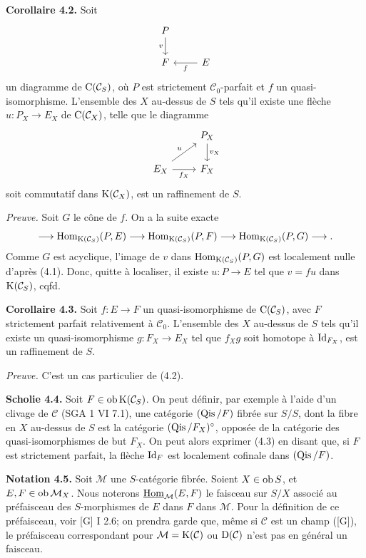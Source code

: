 \documentclass[11pt]{article}
\begin{document}
\textbf{Corollaire 4.2.} Soit
\[
\begin{tikzcd}
P \arrow[d,"v"'] \\
F & E \arrow[l,"f"]
\end{tikzcd}
\]
un diagramme de \(\mathrm C(\mathcal C_S)\), où \(P\) est strictement \(\mathcal C_0\)-parfait et \(f\) un quasi-isomorphisme. L'ensemble des \(X\) au-dessus de \(S\) tels qu'il existe une flèche \(u:P_X\to E_X\) de \(\mathrm C(\mathcal C_X)\), telle que le diagramme
\[
\begin{tikzcd}
& P_X \arrow[d,"v_X"]\\
E_X \arrow[r,"f_X"'] \arrow[ur,"u"] & F_X
\end{tikzcd}
\]
soit commutatif dans \(\mathrm K(\mathcal C_X)\), est un raffinement de \(S\).

\emph{Preuve.} Soit \(G\) le cône de \(f\). On a la suite exacte
\[
  \longrightarrow \operatorname{Hom}_{\mathrm K(\mathcal C_S)}(P,E)
  \longrightarrow \operatorname{Hom}_{\mathrm K(\mathcal C_S)}(P,F)
  \longrightarrow \operatorname{Hom}_{\mathrm K(\mathcal C_S)}(P,G)
  \longrightarrow .
\]
Comme \(G\) est acyclique, l'image de \(v\) dans \(\operatorname{Hom}_{\mathrm K(\mathcal C_S)}(P,G)\) est localement nulle d'après (4.1). Donc, quitte à localiser, il existe \(u:P\to E\) tel que \(v=fu\) dans \(\mathrm K(\mathcal C_S)\), cqfd.

\textbf{Corollaire 4.3.} Soit \(f:E\to F\) un quasi-isomorphisme de \(\mathrm C(\mathcal C_S)\), avec \(F\) strictement parfait relativement à \(\mathcal C_0\). L'ensemble des \(X\) au-dessus de \(S\) tels qu'il existe un quasi-isomorphisme \(g:F_X\to E_X\) tel que \(f_Xg\) soit homotope à \(\operatorname{Id}_{F_X}\), est un raffinement de \(S\).

\emph{Preuve.} C'est un cas particulier de (4.2).

\textbf{Scholie 4.4.} Soit \(F\in\operatorname{ob}\mathrm K(\mathcal C_S)\). On peut définir, par exemple à l'aide d'un clivage de \(\mathcal C\) (SGA 1 VI 7.1), une catégorie \((\operatorname{Qis}/F)\) fibrée sur \(S/S\), dont la fibre en \(X\) au-dessus de \(S\) est la catégorie \((\operatorname{Qis}/F_X)^\circ\), opposée de la catégorie des quasi-isomorphismes de but \(F_X\). On peut alors exprimer (4.3) en disant que, si \(F\) est strictement parfait, la flèche \(\operatorname{Id}_F\) est localement cofinale dans \((\operatorname{Qis}/F)\).

\textbf{Notation 4.5.} Soit \(\mathcal M\) une \(S\)-catégorie fibrée. Soient \(X\in\operatorname{ob} S\), et \(E,F\in\operatorname{ob}\mathcal M_X\). Nous noterons \(\underline{\operatorname{Hom}}_{\mathcal M}(E,F)\) le faisceau sur \(S/X\) associé au préfaisceau des \(S\)-morphismes de \(E\) dans \(F\) dans \(\mathcal M\). Pour la définition de ce préfaisceau, voir [G] I 2.6; on prendra garde que, même si \(\mathcal C\) est un champ ([G]), le préfaisceau correspondant pour \(\mathcal M=\mathrm K(\mathcal C)\) ou \(\mathrm D(\mathcal C)\) n'est pas en général un faisceau.
\end{document}

